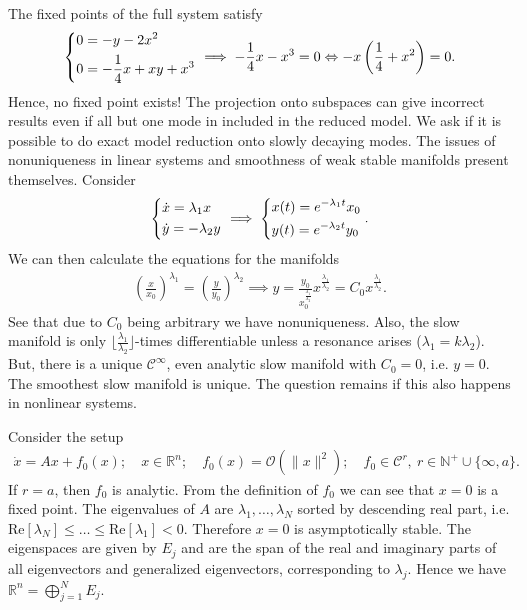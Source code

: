 \begin{ex}[]
	The fixed points of the full system satisfy
	\begin{align}
		\begin{dcases}
		0= -y - 2x^2 \\
		0= - \frac{1}{4} x + xy + x^{3}
		\end{dcases}
		\implies -\frac{1}{4}x - x^3 = 0 \Leftrightarrow -x\left(\frac{1}{4} + x^2\right) = 0.
	\end{align}
	Hence, no fixed point exists! The projection onto subspaces can give incorrect results even if all but one mode in included in the reduced model. We ask if it is possible to do exact model reduction onto slowly decaying modes. The issues of nonuniqueness in linear systems and smoothness of weak stable manifolds present themselves. Consider
	\begin{align}
		\begin{dcases}
		\dot{x} = \lambda_1 x \\
		\dot{y} = -\lambda _2 y 
		\end{dcases}
		\implies 
		\begin{dcases}
			x(t) = e^{-\lambda _1t} x_0 \\
			y(t) = e^{-\lambda_2 t} y_0
		\end{dcases}
		.
	\end{align}
We can then calculate the equations for the manifolds
\begin{align}
	\left(\frac{x}{x_0}\right)^{\lambda _1} = \left(\frac{y}{y_0}\right)^{\lambda_2} \implies y = \frac{y_0}{x_0 ^{\frac{\lambda_1}{\lambda_2}}}x^{\frac{\lambda_1}{\lambda_2}} = C_0 x^{\frac{\lambda_1}{\lambda_2}}.
\end{align}
See that due to $C_0$ being arbitrary we have nonuniqueness. Also, the slow manifold is only $\lfloor \frac{\lambda_1}{\lambda_2}\rfloor$-times differentiable unless a resonance arises ($\lambda_1 = k \lambda_2$). But, there is a unique $\mathcal{C}^{\infty }$, even analytic slow manifold with $C_0=0$, i.e. $y=0$. The smoothest slow manifold is unique. The question remains if this also happens in nonlinear systems.
\end{ex}

Consider the setup
\begin{align}
	\dot{x} = Ax + f_{0}(x);\quad x \in \mathbb{R}^{n};\quad f_0(x) = \mathcal{O}(\|x\|^{2});\quad f_0\in \mathcal{C}^{r},\ r\in \mathbb{N}^{+}\cup\{\infty, a\}.
\end{align}
If $r=a$, then $f_0$ is analytic. From the definition of $f_0$ we can see that $x=0$ is a fixed point. The eigenvalues of $A$ are $\lambda _1,\ldots,\lambda_N$ sorted by descending real part, i.e. $ \textrm{Re} [\lambda _N] \leq \ldots \leq  \textrm{Re} [\lambda _1]<0$. Therefore $x=0$ is asymptotically stable. The eigenspaces are given by $E_{j}$ and are the span of the real and imaginary parts of all eigenvectors and generalized eigenvectors, corresponding to $\lambda _j$. Hence we have $\mathbb{R}^{n} = \bigoplus_{j=1}^{N} E_{j}$.

